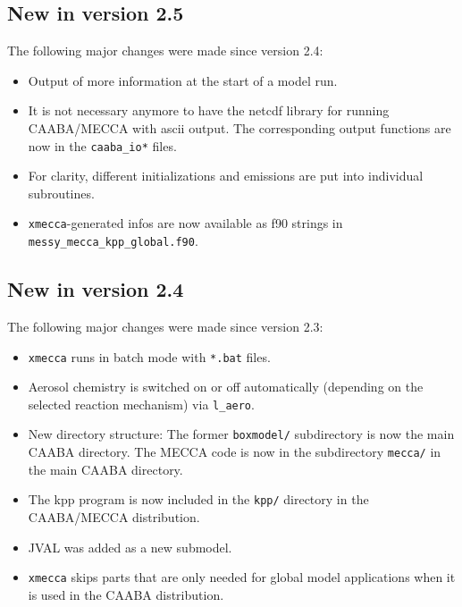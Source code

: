 \documentclass[twoside]{article}
\def\nosep{\setlength\parsep{0mm}\setlength\topsep{0mm}\setlength\itemsep{0mm}}
\begin{document}

\subsection{New in version 2.5}

The following major changes were made since version 2.4:

\begin{itemize}\nosep
\item Output of more information at the start of a model run.
\item It is not necessary anymore to have the netcdf library for running
  CAABA/MECCA with ascii output. The corresponding output functions are
  now in the \verb|caaba_io*| files.
\item For clarity, different initializations and emissions are put into
  individual subroutines.
\item \verb|xmecca|-generated infos are now available as f90 strings in
  \verb|messy_mecca_kpp_global.f90|.
\end{itemize}

\subsection{New in version 2.4}

The following major changes were made since version 2.3:

\begin{itemize}\nosep
\item \verb|xmecca| runs in batch mode with \verb|*.bat| files.
\item Aerosol chemistry is switched on or off automatically (depending
  on the selected reaction mechanism) via \verb|l_aero|.
\item New directory structure: The former \verb|boxmodel/| subdirectory
  is now the main CAABA directory. The MECCA code is now in the
  subdirectory \verb|mecca/| in the main CAABA directory.
\item The kpp program is now included in the \verb|kpp/| directory in
  the CAABA/MECCA distribution.
\item JVAL was added as a new submodel.
\item \verb|xmecca| skips parts that are only needed for global model
  applications when it is used in the CAABA distribution.
\end{itemize}

\end{document}
